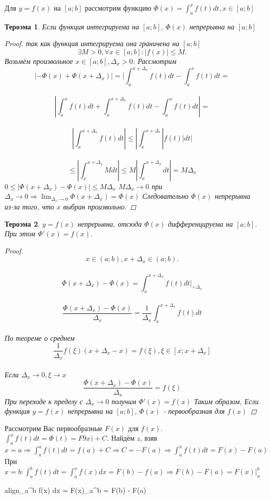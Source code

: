 \documentclass[oneside]{book}
\newcommand{\boxedeq}[2]{\begin{empheq}[box={\fboxsep=6pt\fbox}]{align}\label{#1}#2\end{empheq}}
\newtheorem{thm}{Тероэма}[chapter] %
\begin{document}
\begin{enumerate}
\begin{itemize}
\begin{enumerate}
Для $y = f(x)$ на $[a;b]$ рассмотрим функцию $\Phi(x) = \int_{a}^x f(t) dt, x \in [a;b]$
\begin{thm}
  Если функция интегрируема на $[a;b]$, $\Phi(x)$ непрерывна на $[a;b]$
  \begin{proof}
    так как функция интегрируема она граничена на $[a;b]$ $$
      \exists M > 0, \forall x \in [a;b]: |f(x)| \leq M.
    $$
    Возьмём произвольное $x \in [a;b], \Delta_x > 0$.
    Рассмотрим $$
      |-\Phi(x) + \Phi(x+\Delta_x)| = |\int_{a}^{x+\Delta_x} f(t) dt - \int_{a}^x f(t) dt = $$\\$$
      |\int_{a}^x f(t) dt + \int_{x}^{x+\Delta_x} f(t) dt - \int_{a}^x f(t) dt| = $$\\$$
      |\int_{x}^{x+\Delta_x} f(t) dt| \leq |\int_{x}^{x+\Delta_t} |f(t)| dt| $$\\$$
      \leq |\int_{x}^{x+\Delta_x} M dt| \leq M|\int_{x}^{x+\Delta_x} dt| = M\Delta_x
      $$ $ 0 \leq |\Phi(x+\Delta_x) - \Phi(x)| \leq M\Delta_x $
      $M\Delta_x \rightarrow 0 $ при $ \Delta_x \rightarrow 0 \Rightarrow \lim_{\Delta_x \rightarrow 0}{\Phi(x+\Delta_x)} = \Phi(x)$
      Следовательно $\Phi(x)$ непрерывна из-за того, что $x$ выбран произвольно.
  \end{proof}
\end{thm}
\begin{thm}
  $y = f(x)$ непрерывна, отсюда $\Phi(x)$ дифференцируема на $[a;b]$. При этом $\Phi'(x) = f(x)$.
  \begin{proof}
    $$
      x \in (a;b), x + \Delta_x \in (a;b). $$\\$$
      \Phi (x+\Delta_x) - \Phi(x) = \int_{x}^{x+\Delta_x} f(t) dt \vert_{\div \Delta_x}$$\\$$
      \frac{\Phi(x+\Delta_x) - \Phi(x)}{\Delta_x} = \frac{1}{\Delta_x}\int_{x}^{x+\Delta_x} f(t) dt$$\\
    По теореме о среднем $$
      \frac{1}{\Delta_x}f(\xi)(x+\Delta_x - x) = f(\xi), \xi \in [x; x+\Delta_x]$$\\
      Если $\Delta_x \rightarrow 0, \xi \rightarrow x$ $$
        \frac{\Phi(x+\Delta_x) - \Phi(x)}{\Delta_x} = f(\xi)
      $$ При переходе к пределу с $\Delta_x \rightarrow 0$ получим $\Phi'(x) = f(x)$
      Таким образом, Если функция $y = f(x)$ непрерывна на $[a;b]$, $\Phi(x)$ - первообразная для $f(x)$
  \end{proof}
\end{thm}
Рассмотрим Вас первообразные $F(x)$ для $f(x)$. $\int_{a}^x f(t) dt = \Phi(t) = F9x)+C$.
Найдём $z$, взяв $x = a \Rightarrow \int_{a}^a f(t) dt = f(a)+C \Rightarrow C = -F(a) \Rightarrow \int_{a}^x f(t) dt = F(x) - F(a)$ \\
При $x = b: \int_{a}^b f(t) dt = \int_{a}^x f(x) dx = F(b) - f(a) \Rightarrow F(b) - F(a) = F(x)\vert_{a}^{b}$
\boxedeq{eq:*}{\int_{a}^b f(x) dx = F(x)\vert_{a}^{b} = F(b) - F(a)}



\end{enumerate}
\end{itemize}
\end{enumerate}
\end{document}

